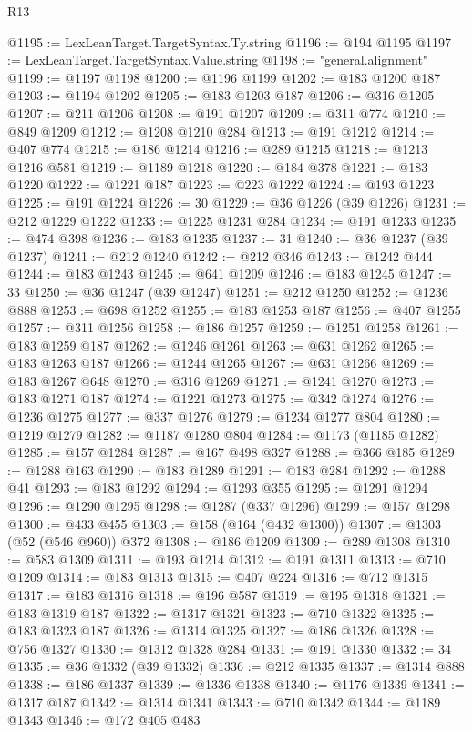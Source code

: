 \begin{lexlean}{R13}
\begin{coremodule}
@1195 := LexLeanTarget.TargetSyntax.Ty.string
@1196 := @194 @1195
@1197 := LexLeanTarget.TargetSyntax.Value.string
@1198 := "general.alignment"
@1199 := @1197 @1198
@1200 := @1196 @1199
@1202 := @183 @1200 @187
@1203 := @1194 @1202
@1205 := @183 @1203 @187
@1206 := @316 @1205
@1207 := @211 @1206
@1208 := @191 @1207
@1209 := @311 @774
@1210 := @849 @1209
@1212 := @1208 @1210 @284
@1213 := @191 @1212
@1214 := @407 @774
@1215 := @186 @1214
@1216 := @289 @1215
@1218 := @1213 @1216 @581
@1219 := @1189 @1218
@1220 := @184 @378
@1221 := @183 @1220
@1222 := @1221 @187
@1223 := @223 @1222
@1224 := @193 @1223
@1225 := @191 @1224
@1226 := 30
@1229 := @36 @1226 (@39 @1226)
@1231 := @212 @1229 @1222
@1233 := @1225 @1231 @284
@1234 := @191 @1233
@1235 := @474 @398
@1236 := @183 @1235
@1237 := 31
@1240 := @36 @1237 (@39 @1237)
@1241 := @212 @1240
@1242 := @212 @346
@1243 := @1242 @444
@1244 := @183 @1243
@1245 := @641 @1209
@1246 := @183 @1245
@1247 := 33
@1250 := @36 @1247 (@39 @1247)
@1251 := @212 @1250
@1252 := @1236 @888
@1253 := @698 @1252
@1255 := @183 @1253 @187
@1256 := @407 @1255
@1257 := @311 @1256
@1258 := @186 @1257
@1259 := @1251 @1258
@1261 := @183 @1259 @187
@1262 := @1246 @1261
@1263 := @631 @1262
@1265 := @183 @1263 @187
@1266 := @1244 @1265
@1267 := @631 @1266
@1269 := @183 @1267 @648
@1270 := @316 @1269
@1271 := @1241 @1270
@1273 := @183 @1271 @187
@1274 := @1221 @1273
@1275 := @342 @1274
@1276 := @1236 @1275
@1277 := @337 @1276
@1279 := @1234 @1277 @804
@1280 := @1219 @1279
@1282 := @1187 @1280 @804
@1284 := @1173 (@1185 @1282)
@1285 := @157 @1284
@1287 := @167 @498 @327
@1288 := @366 @185
@1289 := @1288 @163
@1290 := @183 @1289
@1291 := @183 @284
@1292 := @1288 @41
@1293 := @183 @1292
@1294 := @1293 @355
@1295 := @1291 @1294
@1296 := @1290 @1295
@1298 := @1287 (@337 @1296)
@1299 := @157 @1298
@1300 := @433 @455
@1303 := @158 (@164 (@432 @1300))
@1307 := @1303 (@52 (@546 @960)) @372
@1308 := @186 @1209
@1309 := @289 @1308
@1310 := @583 @1309
@1311 := @193 @1214
@1312 := @191 @1311
@1313 := @710 @1209
@1314 := @183 @1313
@1315 := @407 @224
@1316 := @712 @1315
@1317 := @183 @1316
@1318 := @196 @587
@1319 := @195 @1318
@1321 := @183 @1319 @187
@1322 := @1317 @1321
@1323 := @710 @1322
@1325 := @183 @1323 @187
@1326 := @1314 @1325
@1327 := @186 @1326
@1328 := @756 @1327
@1330 := @1312 @1328 @284
@1331 := @191 @1330
@1332 := 34
@1335 := @36 @1332 (@39 @1332)
@1336 := @212 @1335
@1337 := @1314 @888
@1338 := @186 @1337
@1339 := @1336 @1338
@1340 := @1176 @1339
@1341 := @1317 @187
@1342 := @1314 @1341
@1343 := @710 @1342
@1344 := @1189 @1343
@1346 := @172 @405 @483

\end{coremodule}
\end{lexlean}
